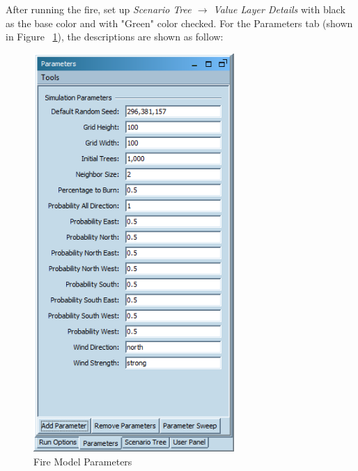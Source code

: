 \documentclass[11pt]{amsart}
\begin{document}
After running the fire, set up \emph{Scenario Tree $\rightarrow$ Value Layer Details} with black as the base color and with "Green" color checked.  For the Parameters tab (shown in Figure ~\ref{fig:fire_param}), the descriptions are shown as follow:

\begin{figure}[h]
\begin{center}
\vspace{.2in}
\centerline {
\includegraphics[width=3in]{Images/fire_param.png}}
\caption{Fire Model Parameters}
\label{fig:fire_param}
\end{center}
\end{figure}
\end{document}
